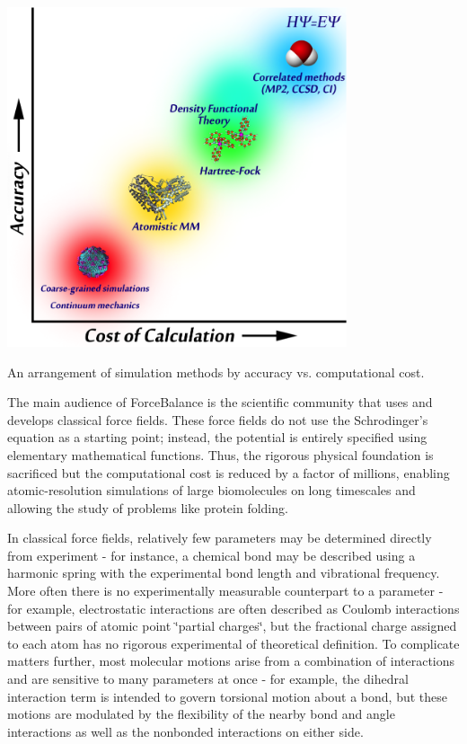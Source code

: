 \begin{DoxyImage}
\includegraphics[width=10cm]{ladder.png}
\caption{\-An arrangement of simulation methods by accuracy vs. computational cost.}
\end{DoxyImage}


\-The main audience of \-Force\-Balance is the scientific community that uses and develops classical force fields. \-These force fields do not use the \-Schrodinger's equation as a starting point; instead, the potential is entirely specified using elementary mathematical functions. \-Thus, the rigorous physical foundation is sacrificed but the computational cost is reduced by a factor of millions, enabling atomic-\/resolution simulations of large biomolecules on long timescales and allowing the study of problems like protein folding.

\-In classical force fields, relatively few parameters may be determined directly from experiment -\/ for instance, a chemical bond may be described using a harmonic spring with the experimental bond length and vibrational frequency. \-More often there is no experimentally measurable counterpart to a parameter -\/ for example, electrostatic interactions are often described as \-Coulomb interactions between pairs of atomic point \char`\"{}partial charges\char`\"{}, but the fractional charge assigned to each atom has no rigorous experimental of theoretical definition. \-To complicate matters further, most molecular motions arise from a combination of interactions and are sensitive to many parameters at once -\/ for example, the dihedral interaction term is intended to govern torsional motion about a bond, but these motions are modulated by the flexibility of the nearby bond and angle interactions as well as the nonbonded interactions on either side.


